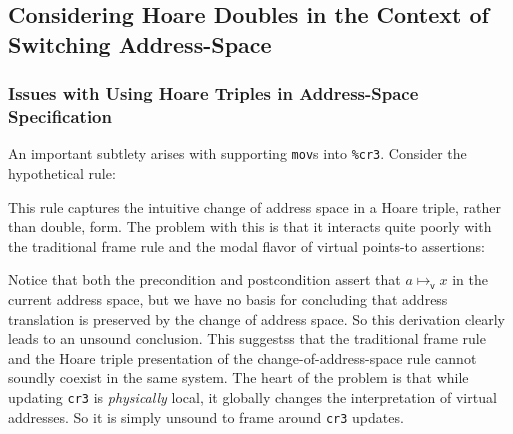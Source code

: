 \subsection{Considering Hoare Doubles in the Context of Switching Address-Space}
\subsubsection{Issues with Using Hoare Triples in Address-Space Specification}
\label{sec:issues}
An important subtlety arises with supporting \lstinline|mov|s into \lstinline|%cr3|. Consider the hypothetical rule:
\begin{mathpar}
\end{mathpar}
This rule captures the intuitive change of address space in a Hoare triple, rather than double, form. The problem with this is that it interacts quite poorly with the traditional frame rule and the modal flavor of virtual points-to assertions:
\begin{mathpar}
\end{mathpar}
Notice that both the precondition and postcondition assert that $a\mapsto_\mathsf{v} x$ in the current address space, but we have no basis for concluding that address translation is preserved by the change of address space. So this derivation clearly leads to an unsound conclusion. This suggestss that the traditional frame rule and the Hoare triple presentation of the change-of-address-space rule cannot soundly coexist in the same system.
The heart of the problem is that while updating \lstinline|cr3| is \emph{physically} local, it globally changes the interpretation of virtual addresses. So it is simply unsound to frame around \lstinline|cr3| updates.

